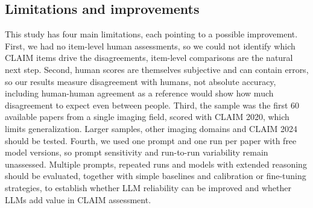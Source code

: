 \subsection{Limitations and improvements}
This study has four main limitations, each pointing to a possible improvement. First, we had no item-level human assessments, so we could not identify which CLAIM items drive the disagreements, item-level comparisons are the natural next step. Second, human scores are themselves subjective and can contain errors, so our results measure disagreement with humans, not absolute accuracy, including human-human agreement as a reference would show how much disagreement to expect even between people. Third, the sample was the first 60 available papers from a single imaging field, scored with CLAIM 2020, which limits generalization. Larger samples, other imaging domains and CLAIM 2024 should be tested. Fourth, we used one prompt and one run per paper with free model versions, so prompt sensitivity and run-to-run variability remain unassessed. Multiple prompts, repeated runs and models with extended reasoning should be evaluated, together with simple baselines and calibration or fine-tuning strategies, to establish whether LLM reliability can be improved and whether LLMs add value in CLAIM assessment.




